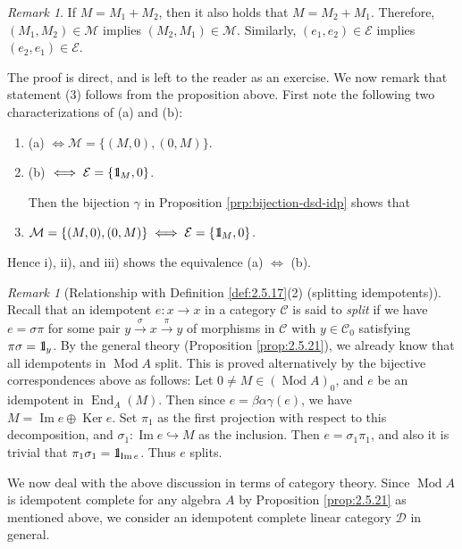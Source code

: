 \documentclass{surv-l}
\numberwithin{equation}{chapter}
\numberwithin{figure}{chapter}
\theoremstyle{plain}
\theoremstyle{definition}
\theoremstyle{remark}
\newtheorem{rmk}[thm]{Remark}
\newcommand{\id}{1\kern-.25em{\text{{\rm l}}}}
\DeclareMathOperator{\Ker}{Ker}
\DeclareMathOperator{\End}{End}
\DeclareMathOperator{\Mod}{Mod}
\begin{document}
\begin{rmk}
If $M = M_1 + M_2$, then it also holds that $M = M_2 + M_1$.
Therefore, $(M_1, M_2) \in \mathcal{M}$ implies $(M_2, M_1) \in \mathcal{M}$.
Similarly,
$(e_1, e_2) \in \mathcal{E}$ implies $(e_2, e_1) \in \mathcal{E}$.
\end{rmk}

The proof is direct, and is left to the reader as an exercise.
We now remark that statement (3) follows from the proposition above.
First note the following two characterizations of (a) and (b):
\begin{enumerate}[wide,label=\roman*)]
\item (a) $\iff \mathcal{M} = \{(M, 0), (0, M)\}$.
\item (b) $\iff \mathcal{E} = \{\id_M, 0\}$.

Then the bijection $\gamma$ in Proposition \ref{prp:bijection-dsd-idp} shows that

\item $\mathcal{M} = \{(M, 0), (0, M)\} \iff \mathcal{E} = \{\id_M, 0\}$.
\end{enumerate}
Hence i), ii), and iii) shows the equivalence (a) $\iff$ (b).

\begin{rmk}[Relationship with Definition \ref{def:2.5.17}(2) (splitting idempotents)]
Recall that an idempotent $e\colon x \to x$ in a category ${\mathcal{C}}$ is said to \emph{split}
if we have $e = \sigma\pi$ for some pair $y \xrightarrow{\sigma} x \xrightarrow{\pi} y$ of morphisms in ${\mathcal{C}}$
with $y \in {\mathcal{C}}_0$ satisfying $\pi\sigma = \id_y$.
By the general theory (Proposition \ref{prop:2.5.21}), we already know that
all idempotents in $\Mod A$ split.
This is proved alternatively by the bijective correspondences above as follows:
Let $0 \ne M \in (\Mod A)_0$, and $e$ be an idempotent in $\End_A(M)$.
Then since $e = \beta \alpha \gamma(e)$, we have $M = \operatorname{Im} e \oplus \Ker e$.
Set $\pi_1$ as the first projection with respect to this decomposition, and
$\sigma_1 \colon \operatorname{Im} e \hookrightarrow M$ as the inclusion.
Then $e = \sigma_1 \pi_1$, and also it is trivial that $\pi_1\sigma_1 = \id_{\operatorname{Im} e}$.
Thus $e$ splits.
\end{rmk}

We now deal with the above discussion in terms of category theory.
Since $\Mod A$ is idempotent complete for any algebra $A$ by Proposition \ref{prop:2.5.21}
as mentioned above,
we consider an idempotent complete linear category ${\mathcal{D}}$ in general.
\end{document}
